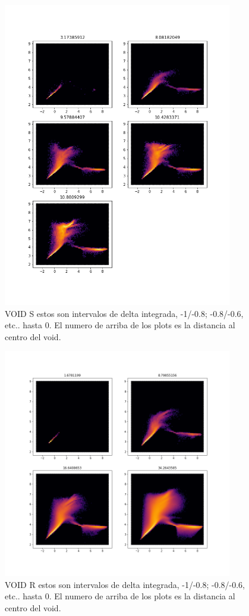\begin{figure}[h]
\centering
\includegraphics[width=10cm]{Figures/DFprof_S.png}
\decoRule
\caption[asd]{VOID S  estos son intervalos de delta integrada, -1/-0.8; -0.8/-0.6, etc.. hasta 0. El numero de arriba de los plots es la distancia al centro del void.}
\label{fig:Electron}
\end{figure}


\begin{figure}[h]
\centering
\includegraphics[width=10cm]{Figures/DFprof_R.png}
\decoRule
\caption[asd]{VOID R estos son intervalos de delta integrada, -1/-0.8; -0.8/-0.6, etc.. hasta 0. El numero de arriba de los plots es la distancia al centro del void. }
\label{fig:Electron}
\end{figure}

